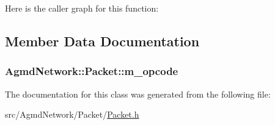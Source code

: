 Here is the caller graph for this function\+:




\subsection{Member Data Documentation}
\hypertarget{class_agmd_network_1_1_packet_abf0dd089350b6fa9ee036f7807af5139}{
\subsubsection[{m\+\_\+opcode}]{ Agmd\+Network\+::\+Packet\+::m\+\_\+opcode\hspace{0.3cm}{\ttfamily [protected]}}}\label{class_agmd_network_1_1_packet_abf0dd089350b6fa9ee036f7807af5139}


The documentation for this class was generated from the following file\+:\begin{DoxyCompactItemize}
\item 
src/\+Agmd\+Network/\+Packet/\hyperlink{_packet_8h}{Packet.\+h}\end{DoxyCompactItemize}
